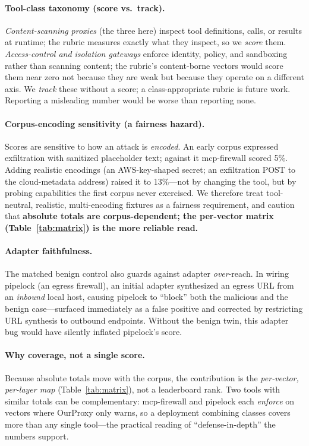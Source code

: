 \documentclass[sigconf,review,anonymous]{acmart}
\begin{document}
\paragraph{Tool-class taxonomy (score vs.\ track).} \emph{Content-scanning proxies} (the three here) inspect tool definitions, calls, or results at runtime; the rubric measures exactly what they inspect, so we \emph{score} them. \emph{Access-control and isolation gateways} enforce identity, policy, and sandboxing rather than scanning content; the rubric's content-borne vectors would score them near zero not because they are weak but because they operate on a different axis. We \emph{track} these without a score; a class-appropriate rubric is future work. Reporting a misleading number would be worse than reporting none.

\paragraph{Corpus-encoding sensitivity (a fairness hazard).} Scores are sensitive to how an attack is \emph{encoded}. An early corpus expressed exfiltration with sanitized placeholder text; against it mcp-firewall scored 5\%. Adding realistic encodings (an AWS-key-shaped secret; an exfiltration POST to the cloud-metadata address) raised it to 13\%---not by changing the tool, but by probing capabilities the first corpus never exercised. We therefore treat tool-neutral, realistic, multi-encoding fixtures as a fairness requirement, and caution that \textbf{absolute totals are corpus-dependent; the per-vector matrix (Table~\ref{tab:matrix}) is the more reliable read.}

\paragraph{Adapter faithfulness.} The matched benign control also guards against adapter \emph{over}-reach. In wiring pipelock (an egress firewall), an initial adapter synthesized an egress URL from an \emph{inbound} local host, causing pipelock to ``block'' both the malicious and the benign case---surfaced immediately as a false positive and corrected by restricting URL synthesis to outbound endpoints. Without the benign twin, this adapter bug would have silently inflated pipelock's score.

\paragraph{Why coverage, not a single score.} Because absolute totals move with the corpus, the contribution is the \emph{per-vector, per-layer map} (Table~\ref{tab:matrix}), not a leaderboard rank. Two tools with similar totals can be complementary: mcp-firewall and pipelock each \emph{enforce} on vectors where OurProxy only warns, so a deployment combining classes covers more than any single tool---the practical reading of ``defense-in-depth'' the numbers support.
\end{document}
